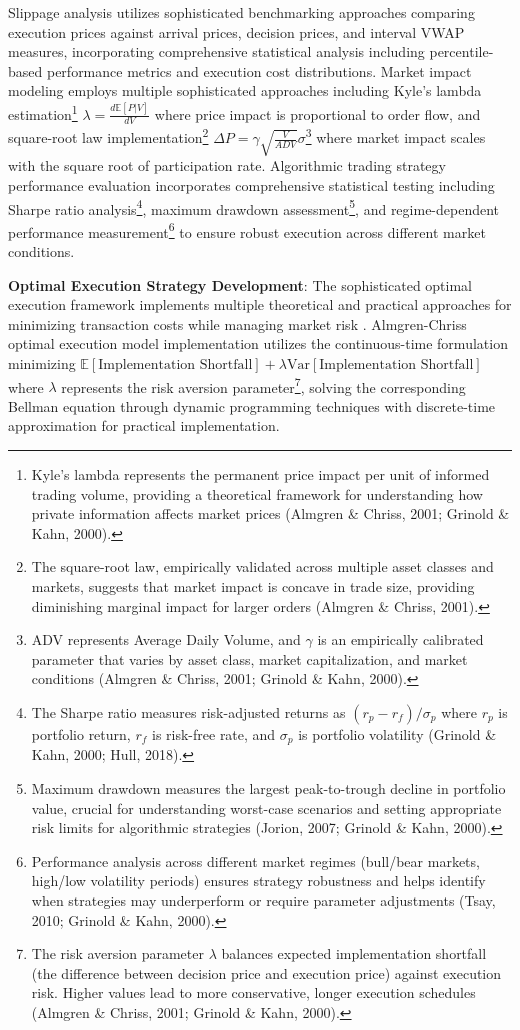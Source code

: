 \documentclass[12pt,a4paper]{article}
\theoremstyle{definition}
\theoremstyle{remark}
\begin{document}
Slippage analysis utilizes sophisticated benchmarking approaches comparing execution prices against arrival prices, decision prices, and interval VWAP measures, incorporating comprehensive statistical analysis including percentile-based performance metrics and execution cost distributions. Market impact modeling employs multiple sophisticated approaches including Kyle's lambda estimation\footnote{Kyle's lambda represents the permanent price impact per unit of informed trading volume, providing a theoretical framework for understanding how private information affects market prices (Almgren \& Chriss, 2001; Grinold \& Kahn, 2000).} $\lambda = \frac{d\mathbb{E}[P|V]}{dV}$ where price impact is proportional to order flow, and square-root law implementation\footnote{The square-root law, empirically validated across multiple asset classes and markets, suggests that market impact is concave in trade size, providing diminishing marginal impact for larger orders (Almgren \& Chriss, 2001).} $\Delta P = \gamma \sqrt{\frac{V}{ADV}} \sigma$\footnote{ADV represents Average Daily Volume, and $\gamma$ is an empirically calibrated parameter that varies by asset class, market capitalization, and market conditions (Almgren \& Chriss, 2001; Grinold \& Kahn, 2000).} where market impact scales with the square root of participation rate. Algorithmic trading strategy performance evaluation incorporates comprehensive statistical testing including Sharpe ratio analysis\footnote{The Sharpe ratio measures risk-adjusted returns as $(r_p - r_f) / \sigma_p$ where $r_p$ is portfolio return, $r_f$ is risk-free rate, and $\sigma_p$ is portfolio volatility (Grinold \& Kahn, 2000; Hull, 2018).}, maximum drawdown assessment\footnote{Maximum drawdown measures the largest peak-to-trough decline in portfolio value, crucial for understanding worst-case scenarios and setting appropriate risk limits for algorithmic strategies (Jorion, 2007; Grinold \& Kahn, 2000).}, and regime-dependent performance measurement\footnote{Performance analysis across different market regimes (bull/bear markets, high/low volatility periods) ensures strategy robustness and helps identify when strategies may underperform or require parameter adjustments (Tsay, 2010; Grinold \& Kahn, 2000).} to ensure robust execution across different market conditions.

\textbf{Optimal Execution Strategy Development}: The sophisticated optimal execution framework implements multiple theoretical and practical approaches for minimizing transaction costs while managing market risk \citep{almgren2001optimal, grinold2000active}. Almgren-Chriss optimal execution model implementation utilizes the continuous-time formulation minimizing $\mathbb{E}[\text{Implementation Shortfall}] + \lambda \text{Var}[\text{Implementation Shortfall}]$ where $\lambda$ represents the risk aversion parameter\footnote{The risk aversion parameter $\lambda$ balances expected implementation shortfall (the difference between decision price and execution price) against execution risk. Higher values lead to more conservative, longer execution schedules (Almgren \& Chriss, 2001; Grinold \& Kahn, 2000).}, solving the corresponding Bellman equation through dynamic programming techniques with discrete-time approximation for practical implementation.
\end{document}
